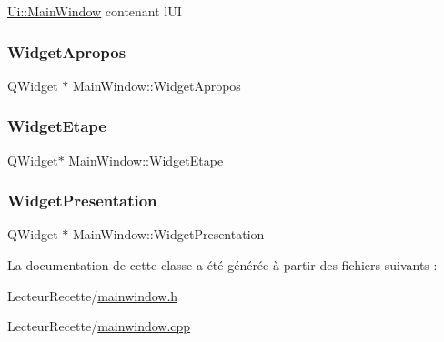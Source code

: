 \hyperlink{class_ui_1_1_main_window}{Ui\+::\+Main\+Window} contenant l\textquotesingle{}UI \mbox{\label{class_main_window_a8a1bf5356fafc93d0b6560427fd022e2}} 
\subsubsection{\texorpdfstring{Widget\+Apropos}{WidgetApropos}}
{\footnotesize\ttfamily Q\+Widget $\ast$ Main\+Window\+::\+Widget\+Apropos\hspace{0.3cm}{\ttfamily [private]}}

\mbox{\label{class_main_window_a8463ff15a4d0c60daf94ef4555710e9b}} 
\subsubsection{\texorpdfstring{Widget\+Etape}{WidgetEtape}}
{\footnotesize\ttfamily Q\+Widget$\ast$ Main\+Window\+::\+Widget\+Etape\hspace{0.3cm}{\ttfamily [private]}}

\mbox{\label{class_main_window_af897497296009c9ed94c40d7785bb847}} 
\subsubsection{\texorpdfstring{Widget\+Presentation}{WidgetPresentation}}
{\footnotesize\ttfamily Q\+Widget $\ast$ Main\+Window\+::\+Widget\+Presentation\hspace{0.3cm}{\ttfamily [private]}}



La documentation de cette classe a été générée à partir des fichiers suivants \+:\begin{DoxyCompactItemize}
\item 
Lecteur\+Recette/\hyperlink{mainwindow_8h}{mainwindow.\+h}\item 
Lecteur\+Recette/\hyperlink{mainwindow_8cpp}{mainwindow.\+cpp}\end{DoxyCompactItemize}
